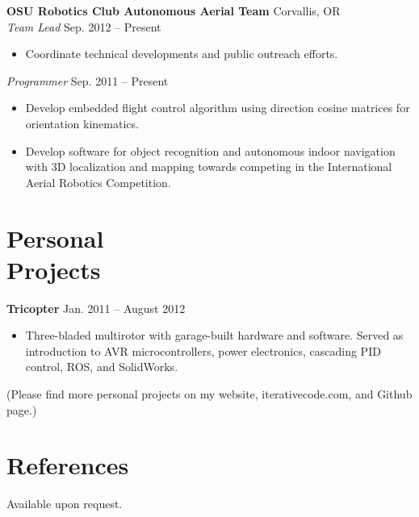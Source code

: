 \documentclass[10pt,letterpaper,margin]{res}
\begin{document}
\begin{resume}
{\bf OSU Robotics Club Autonomous Aerial Team} \hfill {\color{lightgray} Corvallis, OR} \\
{\it Team Lead} \hfill {\color{lightgray} Sep. 2012 -- Present}\vspace{0.2em}

\begin{itemize}
	\item Coordinate technical developments and public outreach efforts.
\end{itemize}

{\it Programmer} \hfill {\color{lightgray} Sep. 2011 -- Present}\vspace{0.2em}

\begin{itemize}
	\item Develop embedded flight control algorithm using direction cosine
		matrices for orientation kinematics.
	\item Develop software for object recognition and autonomous indoor
		navigation with 3D localization and mapping towards competing in the
		International Aerial Robotics Competition.
\end{itemize}



\section{Personal \\ Projects}

{\bf Tricopter} \hfill {\color{lightgray} Jan. 2011 -- August 2012}\vspace{0.2em}

\begin{itemize}
	\item Three-bladed multirotor with garage-built hardware and software.
		Served as introduction to AVR microcontrollers, power electronics,
		cascading PID control, ROS, and SolidWorks.
\end{itemize}

{\footnotesize (Please find more personal projects on my website, iterativecode.com, and Github page.)}



\section{References}

Available upon request.

\end{resume}
\end{document}

